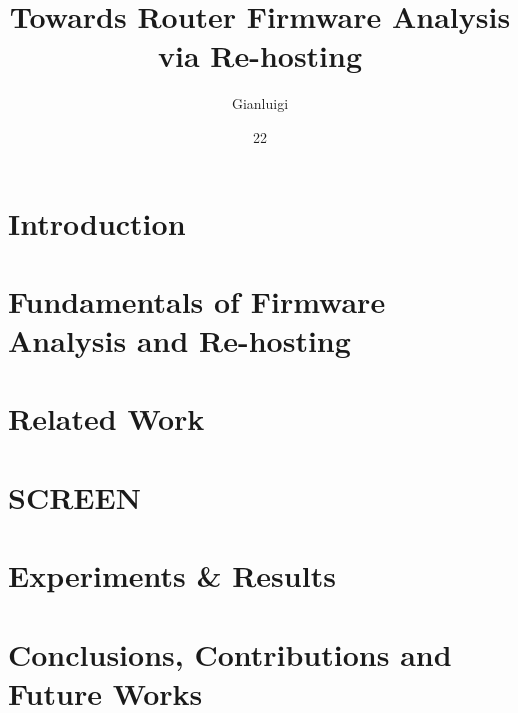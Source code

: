 \documentclass[tg, eng]{ita}    %
\author{Gianluigi}{Dal Toso}
\title{Towards Router Firmware Analysis via Re-hosting}
\date{22}{NOVEMBER}{2021}
\begin{document}


\mainmatter

\chapter{Introduction}\label{chap:introduction}


\chapter{Fundamentals of Firmware Analysis and Re-hosting}\label{chap:fundamentals}


\chapter{Related Work}\label{chap:related}


\chapter{SCREEN}\label{chap:screen}


\chapter{Experiments \& Results}\label{chap:exp_and_results}


% 

\chapter{Conclusions, Contributions and Future Works}\label{chap:conclusions}


% 

% 
\end{document}

